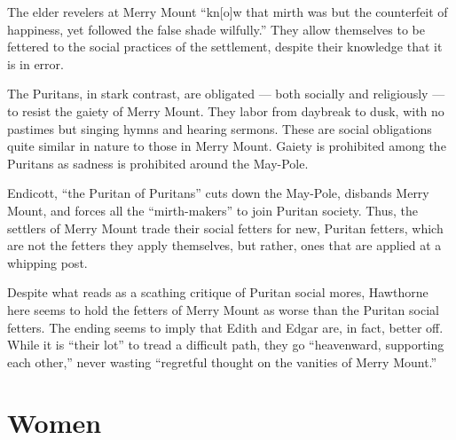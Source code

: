 \documentclass[man,12pt,natbib]{apa6}
\begin{document}
The elder revelers at Merry Mount ``kn[o]w that mirth was but the counterfeit
of happiness, yet followed the false shade wilfully.'' They allow themselves to
be fettered to the social practices of the settlement, despite their knowledge
that it is in error.

The Puritans, in stark contrast, are obligated --- both socially and
religiously --- to resist the gaiety of Merry Mount. They labor from daybreak
to dusk, with no pastimes but singing hymns and hearing sermons. These are
social obligations quite similar in nature to those in Merry Mount. Gaiety is
prohibited among the Puritans as sadness is prohibited around the May-Pole.

Endicott, ``the Puritan of Puritans'' cuts down the May-Pole, disbands Merry
Mount, and forces all the ``mirth-makers'' to join Puritan society. Thus, the
settlers of Merry Mount trade their social fetters for new, Puritan fetters,
which are not the fetters they apply themselves, but rather, ones that are
applied at a whipping post.

Despite what reads as a scathing critique of Puritan social mores, Hawthorne
here seems to hold the fetters of Merry Mount as worse than the Puritan social
fetters. The ending seems to imply that Edith and Edgar are, in fact, better
off. While it is ``their lot'' to tread a difficult path, they go ``heavenward,
supporting each other,'' never wasting ``regretful thought on the vanities of
Merry Mount.''

\nocite{Thoreau12, Melville12, Hawthorne12b}

\clearpage

\section{Women}

\end{document}
